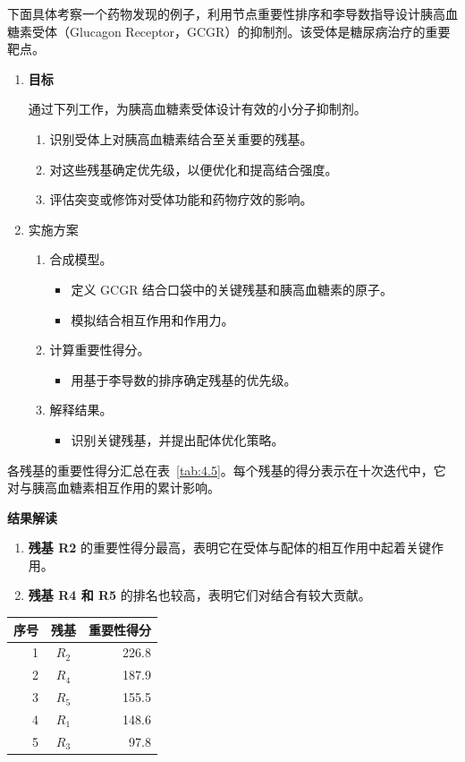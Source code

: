 下面具体考察一个药物发现的例子，利用节点重要性排序和李导数指导设计胰高血糖素受体（Glucagon Receptor，GCGR）的抑制剂。该受体是糖尿病治疗的重要靶点。
\begin{enumerate}[label=\alph*.]
  \item \textbf{目标}

  通过下列工作，为胰高血糖素受体设计有效的小分子抑制剂。
  \begin{enumerate}[label=\arabic*.]
    \item 识别受体上对胰高血糖素结合至关重要的残基。
    \item 对这些残基确定优先级，以便优化和提高结合强度。
    \item 评估突变或修饰对受体功能和药物疗效的影响。
  \end{enumerate}
  \item 实施方案
  \begin{enumerate}[label=\arabic*.]
    \item 合成模型。
    \begin{itemize}[label=--]
      \item 定义 GCGR 结合口袋中的关键残基和胰高血糖素的原子。
      \item 模拟结合相互作用和作用力。
    \end{itemize}
    \item 计算重要性得分。
    \begin{itemize}[label=--]
      \item 用基于李导数的排序确定残基的优先级。
    \end{itemize}
    \item 解释结果。
    \begin{itemize}[label=--]
      \item 识别关键残基，并提出配体优化策略。
    \end{itemize}
  \end{enumerate}
\end{enumerate}

各残基的重要性得分汇总在表~\ref{tab:4.5}。每个残基的得分表示在十次迭代中，它对与胰高血糖素相互作用的累计影响。

\textbf{结果解读}
\begin{enumerate}
  \item \textbf{残基 R2} 的重要性得分最高，表明它在受体与配体的相互作用中起着关键作用。
  \item \textbf{残基 R4 和 R5} 的排名也较高，表明它们对结合有较大贡献。
\end{enumerate}

\begin{table}[htbp]
  \centering
  \begin{tabular}{rcr}
    \toprule
    序号 & 残基 & 重要性得分 \\
    \midrule
    1 & $R_2$ & 226.8 \\
    2 & $R_4$ & 187.9 \\
    3 & $R_5$ & 155.5 \\
    4 & $R_1$ & 148.6 \\
    5 & $R_3$ & 97.8 \\
    \bottomrule
  \end{tabular}
\end{table}
